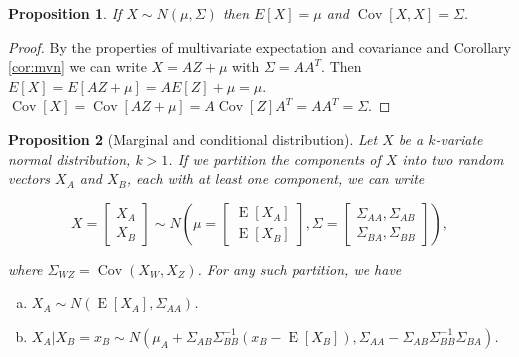 \documentclass{book}
\theoremstyle{plain}%
\newtheorem{proposition}{Proposition}[section]
\theoremstyle{definition}
\DeclareMathOperator{\Cov}{Cov}
\DeclareMathOperator{\E}{E}
\begin{document}
\begin{proposition}
If $X \sim N(\mu, \Sigma)$ then $E[X] = \mu$ and $\Cov[X,X] = \Sigma$.\label{prop:mvnmean}
\end{proposition}

\begin{proof}
By the properties of multivariate expectation and covariance and Corollary \ref{cor:mvn} we can write $X = AZ + \mu$ with $\Sigma = AA^T$. Then $E[X] = E[AZ + \mu] = AE[Z] + \mu = \mu$. $\Cov[X] = \Cov[AZ + \mu] = A\Cov[Z]A^T = AA^T = \Sigma$.
\end{proof}

\begin{proposition}[Marginal and conditional distribution]
Let $X$ be a $k$-variate normal distribution, $k > 1$. If we partition the components of $X$ into two random vectors $X_A$ and $X_B$, each with at least one component, we can write

$$X = \begin{bmatrix}
           X_{A} \\
           X_{B}
         \end{bmatrix}\sim N\left( \mu =  \begin{bmatrix}
           \E[X_A] \\
           \E[X_B]
         \end{bmatrix}, \Sigma = \begin{bmatrix}
           \Sigma_{AA}, \Sigma_{AB} \\
           \Sigma_{BA}, \Sigma_{BB}
         \end{bmatrix}  \right),$$

where $\Sigma_{WZ} = \Cov(X_W, X_Z)$. For any such partition, we have

\begin{enumerate}[(a)]
\item $X_A \sim N(\E[X_A], \Sigma_{AA})$.
\item $X_A | X_B = x_B \sim N(\mu_A + \Sigma_{AB}\Sigma_{BB}^{-1}(x_B - \E[X_B]), \Sigma_{AA} - \Sigma_{AB}\Sigma_{BB}^{-1}\Sigma_{BA})$.

\end{enumerate}\label{prop:marginal}

\end{proposition}
\end{document}

